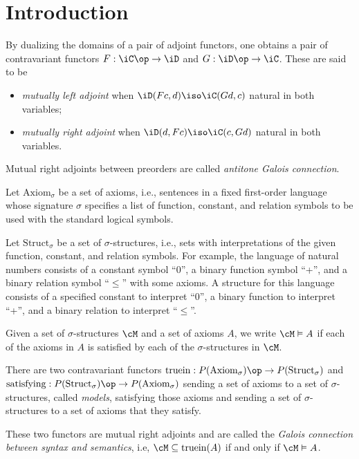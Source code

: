 \documentclass{amsart}
\title{}
\author{Frank Tsai}
\date{\today}
\begin{document}
\maketitle
\tableofcontents

\section{Introduction}
\label{sec:introduction}

\begin{defn}
  By dualizing the domains of a pair of adjoint functors, one obtains a pair of contravariant functors $F : \iC\op \to \iD$ and $G : \iD\op \to \iC$.
  These are said to be
  \begin{itemize}
  \item \emph{mutually left adjoint} when $\iD(Fc, d) \iso \iC(Gd, c)$ natural in both variables;
  \item \emph{mutually right adjoint} when $\iD(d, Fc) \iso \iC(c, Gd)$ natural in both variables. 
  \end{itemize}
\end{defn}

Mutual right adjoints between preorders are called \emph{antitone Galois connection}.

\begin{eg}
  Let $\mathrm{Axiom}_{\sigma}$ be a set of axioms, i.e., sentences in a fixed first-order language whose signature $\sigma$ specifies a list of function, constant, and relation symbols to be used with the standard logical symbols.

  Let $\mathrm{Struct}_{\sigma}$ be a set of $\sigma$-structures, i.e., sets with interpretations of the given function, constant, and relation symbols.
  For example, the language of natural numbers consists of a constant symbol ``0'', a binary function symbol ``+'', and a binary relation symbol ``$\leq$'' with some axioms.
  A structure for this language consists of a specified constant to interpret ``0'', a binary function to interpret ``+'', and a binary relation to interpret ``$\leq$''.

  Given a set of $\sigma$-structures $\cM$ and a set of axioms $A$, we write $\cM \vDash A$ if each of the axioms in $A$ is satisfied by each of the $\sigma$-structures in $\cM$.

  There are two contravariant functors $\mathrm{truein} : P(\mathrm{Axiom}_{\sigma})\op \to P(\mathrm{Struct}_{\sigma})$ and $\mathrm{satisfying} : P(\mathrm{Struct}_{\sigma})\op \to P(\mathrm{Axiom}_{\sigma})$ sending a set of axioms to a set of $\sigma$-structures, called \emph{models}, satisfying those axioms and sending a set of $\sigma$-structures to a set of axioms that they satisfy.

  These two functors are mutual right adjoints and are called the \emph{Galois connection between syntax and semantics}, i.e, $\cM \subseteq \mathrm{truein}(A)$ if and only if $\cM \vDash A$.
\end{eg}
\end{document}
